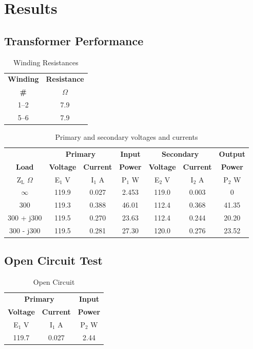 \documentclass{article}
\begin{document}
\section{Results}
\subsection{Transformer Performance}
\begin{table}[H]
  \centering
  \begin{tabular}{*{2}{c}}
    \textbf{Winding} & \textbf{Resistance} \\
    \textbf{\#} & $\Omega$ \\
    \hline
    1--2 &  7.9 \\
    5--6 &  7.9 \\
  \end{tabular}
  \caption{Winding Resistances}
  \label{tab:wind_res}
\end{table}

\begin{table}[H]
  \centering
  \begin{tabular}{*{7}{c}}
    & \multicolumn{2}{c}{\textbf{Primary}} & \textbf{Input}
    & \multicolumn{2}{c}{\textbf{Secondary}} & \textbf{Output} \\
    \textbf{Load} & \textbf{Voltage} & \textbf{Current} & \textbf{Power}
    & \textbf{Voltage} & \textbf{Current} & \textbf{Power} \\
    Z$_\text{L}$ $\Omega$ & E$_1$ V & I$_1$ A & P$_1$ W
    & E$_2$ V & I$_2$ A &
    P$_2$ W \\
    \hline
    $\infty$   & 119.9 & 0.027 & 2.453 & 119.0 & 0.003 & 0 \\
    300        & 119.3 & 0.388 & 46.01 & 112.4 & 0.368 & 41.35 \\
    300 + j300 & 119.5 & 0.270 & 23.63 & 112.4 & 0.244 & 20.20 \\
    300 - j300 & 119.5 & 0.281 & 27.30 & 120.0 & 0.276 & 23.52 \\
  \end{tabular}
  \caption{Primary and secondary voltages and currents}
  \label{tab:volt_rat}
\end{table}

\subsection{Open Circuit Test}
\begin{table}[H]
  \centering
  \begin{tabular}{*{3}{c}}
    \multicolumn{2}{c}{\textbf{Primary}} & \textbf{Input} \\
    \textbf{Voltage} & \textbf{Current} & \textbf{Power} \\
    E$_1$ V & I$_1$ A & P$_2$ W \\
    \hline
    119.7 & 0.027 & 2.44 \\
  \end{tabular}
  \caption{Open Circuit}
  \label{tab:open_circ}
\end{table}
\end{document}
